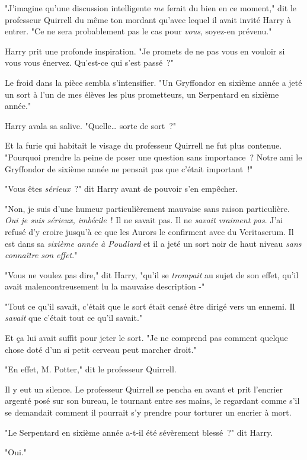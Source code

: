"J'imagine qu'une discussion intelligente \emph{me} ferait du bien en ce moment," dit le professeur Quirrell du même ton mordant qu'avec lequel il avait invité Harry à entrer. "Ce ne sera probablement pas le cas pour \emph{vous}, soyez-en prévenu."

Harry prit une profonde inspiration. "Je promets de ne pas vous en vouloir si vous vous énervez. Qu'est-ce qui s'est passé~?"

Le froid dans la pièce sembla s'intensifier. "Un Gryffondor en sixième année a jeté un sort à l'un de mes élèves les plus prometteurs, un Serpentard en sixième année."

Harry avala sa salive. "Quelle… sorte de sort~?"

Et la furie qui habitait le visage du professeur Quirrell ne fut plus contenue. "Pourquoi prendre la peine de poser une question sans importance~? Notre ami le Gryffondor de sixième année ne pensait pas que c'était important~!"

"Vous êtes \emph{sérieux}~?" dit Harry avant de pouvoir s'en empêcher.

"Non, je suis d'une humeur particulièrement mauvaise sans raison particulière. \emph{Oui je suis sérieux, imbécile}~! Il ne savait pas. Il ne \emph{savait vraiment pas}. J'ai refusé d'y croire jusqu'à ce que les Aurors le confirment avec du Veritaserum. Il est dans sa \emph{sixième année à Poudlard} et il a jeté un sort noir de haut niveau \emph{sans connaître son effet}."

"Vous ne voulez pas dire," dit Harry, "qu'il se \emph{trompait} au sujet de son effet, qu'il avait malencontreusement lu la mauvaise description -"

"Tout ce qu'il savait, c'était que le sort était censé être dirigé vers un ennemi. Il \emph{savait} que c'était tout ce qu'il savait."

Et ça lui avait suffit pour jeter le sort. "Je ne comprend pas comment quelque chose doté d'un si petit cerveau peut marcher droit."

"En effet, M. Potter," dit le professeur Quirrell.

Il y eut un silence. Le professeur Quirrell se pencha en avant et prit l'encrier argenté posé sur son bureau, le tournant entre ses mains, le regardant comme s'il se demandait comment il pourrait s'y prendre pour torturer un encrier à mort.

"Le Serpentard en sixième année a-t-il été sévèrement blessé~?" dit Harry.

"Oui."

